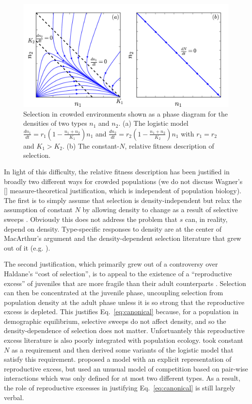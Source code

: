 \documentclass[12pt]{article}
\begin{document}
\begin{figure}
\centering
\includegraphics[scale=0.8]{Kplot.pdf}
\caption{\label{fig:Ksel} Selection in crowded environments shown as a phase diagram for the densities of two types $n_1$ and $n_2$. (a) The logistic model $\frac{dn_1}{dt}=r_1(1-\frac{n_1+n_2}{K_1})n_1$ and $\frac{dn_2}{dt}=r_2(1-\frac{n_1+n_2}{K_2})n_1$ with $r_1=r_2$ and $K_1>K_2$. (b) The constant-$N$, relative fitness description of selection.}
\end{figure}

In light of this difficulty, the relative fitness description has been justified in broadly two different ways for crowded populations (we do not discuss Wagner's [\citeyear{wagner_2010}] measure-theoretical justification, which is independent of population biology). The first is to simply assume that selection is density-independent but relax the assumption of constant $N$ by allowing density to change as a result of selective sweeps \citep[pp. 468]{barton_2007} \citep{prout_1980}. Obviously this does not address the problem that $s$ can, in reality, depend on density. Type-specific responses to density are at the center of MacArthur's argument and the density-dependent selection literature that grew out of it (e.g. \citep{roughgarden_1979}). 

The second justification, which primarily grew out of a controversy over Haldane's ``cost of selection'', is to appeal to the existence of a ``reproductive excess'' of juveniles that are more fragile than their adult counterparts \citep{turner1968population,kimura1969natural,nei1971fertility}. Selection can then be concentrated at the juvenile phase, uncoupling selection from population density at the adult phase unless it is so strong that the reproductive excess is depleted. This justifies Eq.~\eqref{eq:canonical} because, for a population in demographic equilibrium, selective sweeps do not affect density, and so the density-dependence of selection does not matter. Unfortuantely this reproductive excess literature is also poorly integrated with population ecology. \cite{kimura1969natural} took constant $N$ as a requirement and then derived some variants of the logistic model that satisfy this requirement. \cite{nei1971fertility} proposed a model with an explicit representation of reproductive excess, but used an unusual model of competition based on pair-wise interactions which was only defined for at most two different types. As a result, the role of reproductive excesses in justifying Eq.~\eqref{eq:canonical} is still largely verbal.
\end{document}
